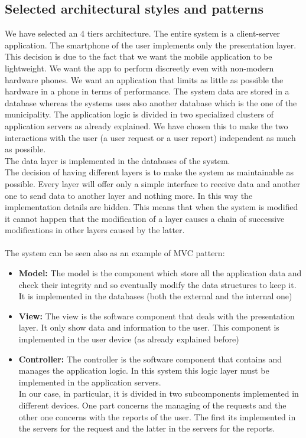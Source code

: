 \documentclass[titlepage]{article}
\begin{document}
\subsection{Selected architectural styles and patterns}
We have selected an 4 tiers architecture. The entire system is a client-server application. The smartphone of the user implements only the presentation layer. This decision is due to the fact that we want the mobile application to be lightweight. We want the app to perform discreetly even with non-modern hardware phones. We want an application that limits as little as possible the hardware in a phone in terms of performance. The system data are stored in a database  whereas the systems uses also another database which is the one of the municipality.
The application logic is divided in two specialized clusters of application servers as already explained. We have chosen this to make the two interactions with the user (a user request or a user report) independent as much as possible.\\
 The data layer is implemented in the databases of the system.\\
The decision of having different layers is to make the system as maintainable as possible. Every layer will offer only a simple interface to receive data and another one to send data to another layer and nothing more. In this way the implementation details are hidden. This means that when the system is modified it cannot happen that the modification of a layer causes a chain of successive modifications in other layers caused by the latter.\\ \\
The system can be seen also as an example of MVC pattern:
\begin{itemize}
	 \item \textbf{Model:} The model is the component which store all the application data and check their integrity and so eventually modify the data structures to keep it. It is implemented in the databases (both the external and the internal one)
	 \item \textbf{View:} The view is the software component that deals with the presentation layer. It only show data and information to the user. This component is implemented in the user device (as already explained before)
	 \item \textbf{Controller:} The controller is the software component that contains and manages the application logic. In this system this logic layer must be implemented in the application servers. \\
In our case, in particular, it is divided in two subcomponents implemented in different devices. One part concerns the managing of the requests and the other one concerns with the reports of the user. The first its implemented in the servers for the request and the latter in the servers for the reports.
\end{itemize}
\end{document}
